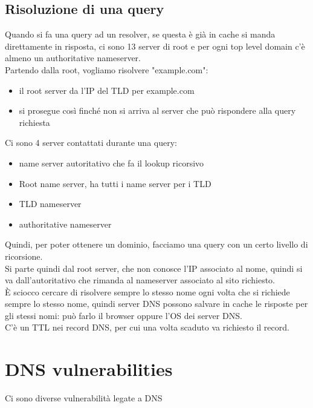 \documentclass[12pt, oneside]{extbook} %
\begin{document}
\subsection{Risoluzione di una query}
Quando si fa una query ad un resolver, se questa è già in cache si manda direttamente in risposta, ci sono 13 server di root e per ogni top level domain c'è almeno un authoritative nameserver.
\\Partendo dalla root, vogliamo risolvere "example.com":
\begin{itemize}
	\item il root server da l'IP del TLD per example.com
	\item si prosegue così finché non si arriva al server che può rispondere alla query richiesta
\end{itemize}

Ci sono 4 server contattati durante una query:
\begin{itemize}
	\item name server autoritativo che fa il lookup ricorsivo
	\item Root name server, ha tutti i name server per i TLD
	\item TLD nameserver 
	\item authoritative nameserver
\end{itemize}
Quindi, per poter ottenere un dominio, facciamo una query con un certo livello di ricorsione.
\\Si parte quindi dal root server, che non conosce l'IP associato al nome, quindi si va dall'autoritativo che rimanda al nameserver associato al sito richiesto.
\\È sciocco cercare di risolvere sempre lo stesso nome ogni volta che si richiede sempre lo stesso nome, quindi server DNS possono salvare in cache le risposte per gli stessi nomi: può farlo il browser oppure l'OS dei server DNS.
\\C'è un TTL nei record DNS, per cui una volta scaduto va richiesto il record.

\section{DNS vulnerabilities}
Ci sono diverse vulnerabilità legate a DNS
\end{document}
